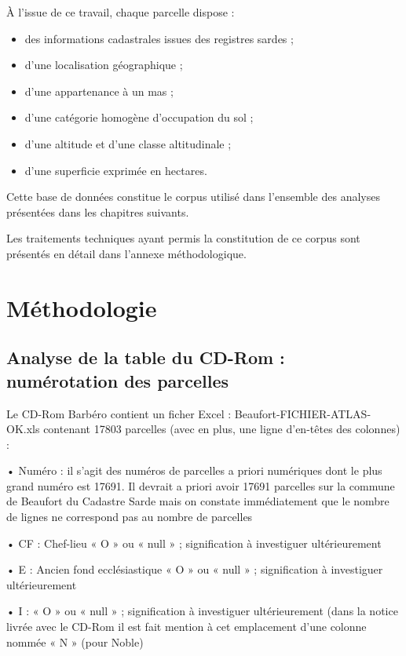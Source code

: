 À l'issue de ce travail, chaque parcelle dispose :

\begin{itemize}
	\item des informations cadastrales issues des registres sardes ;
	\item d'une localisation géographique ;
	\item d'une appartenance à un mas ;
	\item d'une catégorie homogène d'occupation du sol ;
	\item d'une altitude et d'une classe altitudinale ;
	\item d'une superficie exprimée en hectares.
\end{itemize}

Cette base de données constitue le corpus utilisé dans l'ensemble des analyses présentées dans les chapitres suivants.

Les traitements techniques ayant permis la constitution de ce corpus sont présentés en détail dans l'annexe méthodologique.

\section{Méthodologie}

\subsection{Analyse de la table du CD-Rom : numérotation des parcelles}

Le CD-Rom Barbéro contient un ficher Excel : Beaufort-FICHIER-ATLAS-OK.xls contenant 17803 parcelles  (avec en plus, une ligne d’en-têtes des colonnes) :

•	Numéro : il s’agit des numéros de parcelles a priori numériques dont le plus grand numéro est 17691. Il devrait a priori avoir 17691 parcelles sur la commune de Beaufort du Cadastre Sarde mais on constate immédiatement que le nombre de lignes ne correspond pas au nombre de parcelles

•	CF : Chef-lieu « O » ou « null » ; signification à investiguer ultérieurement

•	E : Ancien fond ecclésiastique « O » ou « null » ; signification à investiguer ultérieurement

•	I : « O » ou « null » ; signification à investiguer ultérieurement (dans la notice livrée avec le CD-Rom il est fait mention à cet emplacement d’une colonne nommée « N » (pour Noble)

